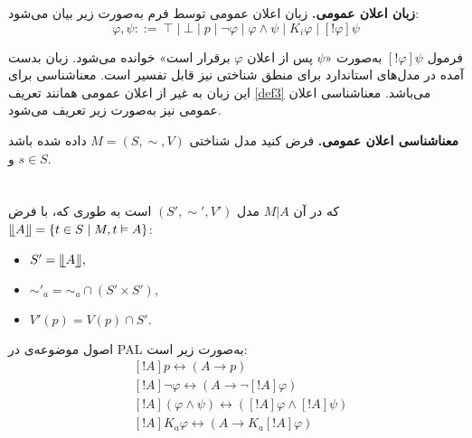 \begin{definition}{\textbf{زبان اعلان عمومی.}}
زبان اعلان عمومی توسط فرم  به‌صورت زیر بیان می‌شود:
\begin{equation*}
\varphi,\psi ::=\ \top\mid\bot\mid p \mid\neg\varphi\mid\varphi\wedge\psi\mid K_i\varphi\mid\left[ !\varphi\right] \psi
\end{equation*}
\end{definition}
فرمول $ [!\varphi]\psi $ به‌صورت «$ \psi $ پس از اعلان $ \varphi $ برقرار است» خوانده می‌شود. زبان بدست آمده  در مدل‌های استاندارد برای منطق شناختی نیز قابل تفسیر است. معناشناسی برای این زبان به غیر از اعلان عمومی همانند تعریف \ref{def3} می‌باشد. معناشناسی اعلان عمومی نیز به‌صورت زیر تعریف می‌شود.
\begin{definition}{\textbf{معناشناسی اعلان عمومی.}}
فرض کنید مدل شناختی  $ M=(S,\sim,V) $ داده شده باشد و $ s\in S $.
\\

\\
\\
که در آن $ M|A $ مدل $ (S',\sim ',V') $ است به طوری که، با فرض
$ \llfloor A\rrfloor =\{t\in S\mid M,t\vDash A\} $:
\begin{LTR}
\begin{itemize}
\item
$ S'=\llfloor A\rrfloor, $
\item
$ \sim'_a=\sim_a\cap(S'\times S'), $
\item
$ V'(p)=V(p)\cap S'. $
\end{itemize}
\end{LTR}
\end{definition}
اصول موضوعه‌‌ی {\reduction} در PAL به‌صورت زیر است:
\begin{align}
&[!A]p\leftrightarrow(A\rightarrow p)\label{1}\\
&[!A]\neg\varphi\leftrightarrow(A\rightarrow\neg[!A]\varphi)\label{2}\\
&[!A](\varphi\wedge\psi)\leftrightarrow([!A]\varphi\wedge[!A]\psi)\label{3}\\
&[!A]K_a \varphi\leftrightarrow(A\rightarrow K_a[!A]\varphi)\label{4}
\end{align}


